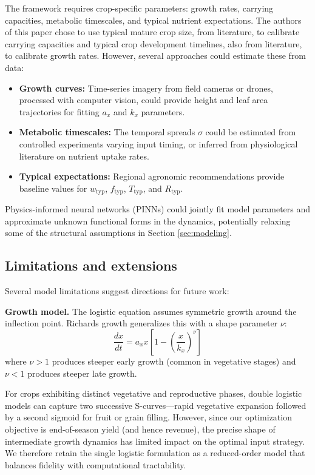 \documentclass[preprint,12pt]{elsarticle}
\newcommand{\df}[2]{\displaystyle\frac{#1}{#2}}
\begin{document}
The framework requires crop-specific parameters: growth rates, carrying capacities, metabolic timescales, and typical nutrient expectations. The authors of this paper chose to use typical mature crop size, from literature, to calibrate carrying capacities and typical crop development timelines, also from literature, to calibrate growth rates. However, several approaches could estimate these from data:

\begin{itemize}
\item \textbf{Growth curves:} Time-series imagery from field cameras or drones, processed with computer vision, could provide height and leaf area trajectories for fitting $a_{x}$ and $k_{x}$ parameters.
\item \textbf{Metabolic timescales:} The temporal spreads $\sigma$ could be estimated from controlled experiments varying input timing, or inferred from physiological literature on nutrient uptake rates.
\item \textbf{Typical expectations:} Regional agronomic recommendations provide baseline values for $w_{\text{typ}}$, $f_{\text{typ}}$, $T_{\text{typ}}$, and $R_{\text{typ}}$.
\end{itemize}

Physics-informed neural networks (PINNs) could jointly fit model parameters and approximate unknown functional forms in the dynamics, potentially relaxing some of the structural assumptions in Section \ref{sec:modeling}.

\subsection{Limitations and extensions}\label{subsec:limitations}

Several model limitations suggest directions for future work:

\textbf{Growth model.} The logistic equation assumes symmetric growth around the inflection point. Richards growth \cite{richards1959} generalizes this with a shape parameter $\nu$:
\begin{equation}
\df{dx}{dt} = a_{x}x\left[ 1 - \left( \df{x}{k_{x}} \right)^{\nu} \right]
\label{eqn:richards-growth}
\end{equation}
where $\nu > 1$ produces steeper early growth (common in vegetative stages) and $\nu < 1$ produces steeper late growth.

For crops exhibiting distinct vegetative and reproductive phases, double logistic models can capture two successive S-curves---rapid vegetative expansion followed by a second sigmoid for fruit or grain filling. However, since our optimization objective is end-of-season yield (and hence revenue), the precise shape of intermediate growth dynamics has limited impact on the optimal input strategy. We therefore retain the single logistic formulation as a reduced-order model that balances fidelity with computational tractability.
\end{document}
